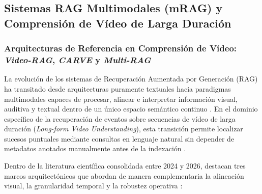 
\subsection{Sistemas RAG Multimodales (mRAG) y Comprensión de Vídeo de Larga Duración}
\label{subsec:sistemas_mrag}

\subsubsection{Arquitecturas de Referencia en Comprensión de Vídeo: \textit{Video-RAG}, \textit{CARVE} y \textit{Multi-RAG}}
\label{subsubsec:arquitecturas_videorag_carve_multirag}

La evolución de los sistemas de Recuperación Aumentada por Generación (RAG) ha transitado desde arquitecturas puramente textuales hacia paradigmas multimodales capaces de procesar, alinear e interpretar información visual, auditiva y textual dentro de un único espacio semántico continuo \cite{prajwal2025multimodal, multi_rag2025}. %
En el dominio específico de la recuperación de eventos sobre secuencias de vídeo de larga duración (\textit{Long-form Video Understanding}), esta transición permite localizar sucesos puntuales mediante consultas en lenguaje natural sin depender de metadatos anotados manualmente antes de la indexación \cite{video_rag2024}. %

Dentro de la literatura científica consolidada entre 2024 y 2026, destacan tres marcos arquitectónicos que abordan de manera complementaria la alineación visual, la granularidad temporal y la robustez operativa \cite{video_rag2024, multi_rag2025}: %

